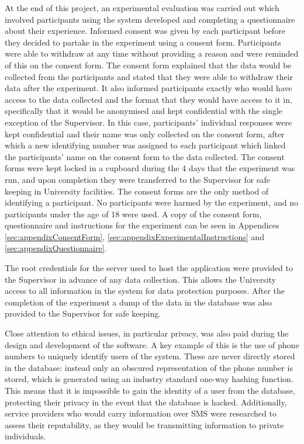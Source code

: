 \documentclass[authoryearcitations]{UoYCSproject}
\begin{document}
At the end of this project, an experimental evaluation was carried out which involved participants using the system developed and completing a questionnaire about their experience. Informed consent was given by each participant before they decided to partake in the experiment using a consent form. Participants were able to withdraw at any time without providing a reason and were reminded of this on the consent form. The consent form explained that the data would be collected from the participants and stated that they were able to withdraw their data after the experiment. It also informed participants exactly who would have access to the data collected and the format that they would have access to it in, specifically that it would be anonymised and kept confidential with the single exception of the Supervisor. In this case, participants' individual responses were kept confidential and their name was only collected on the consent form, after which a new identifying number was assigned to each participant which linked the participants' name on the consent form to the data collected. The consent forms were kept locked in a cupboard during the 4 days that the experiment was run, and upon completion they were transferred to the Supervisor for safe keeping in University facilities. The consent forms are the only method of identifying a participant. No participants were harmed by the experiment, and no participants under the age of 18 were used. A copy of the consent form, questionnaire and instructions for the experiment can be seen in Appendices \ref{sec:appendixConsentForm}, \ref{sec:appendixExperimentalInstructions} and \ref{sec:appendixQuestionnaire}.

The root credentials for the server used to host the application were provided to the Supervisor in advance of any data collection. This allows the University access to all information in the system for data protection purposes. After the completion of the experiment a dump of the data in the database was also provided to the Supervisor for safe keeping.

Close attention to ethical issues, in particular privacy, was also paid during the design and development of the software. A key example of this is the use of phone numbers to uniquely identify users of the system. These are never directly stored in the database: instead only an obscured representation of the phone number is stored, which is generated using an industry standard one-way hashing function. This means that it is impossible to gain the identity of a user from the database, protecting their privacy in the event that the database is hacked.  Additionally, service providers who would carry information over SMS were researched to assess their reputability, as they would be transmitting information to private individuals. 
\end{document}
